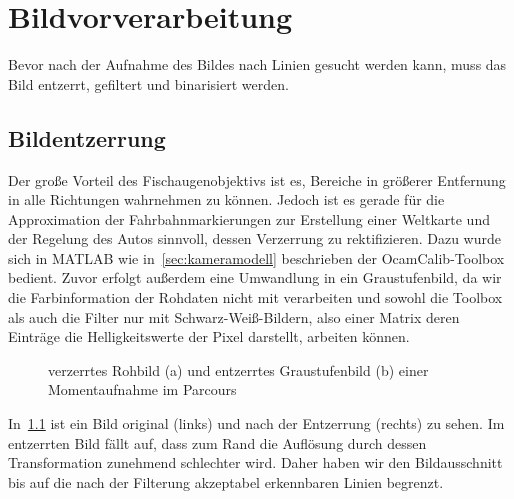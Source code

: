 \chapter{Bildvorverarbeitung \dcfirstauthorshort}
\label{cha:bildvorverarbeitung}

Bevor nach der Aufnahme des Bildes nach Linien gesucht werden kann, muss das Bild entzerrt, gefiltert und binarisiert werden. 

\section{Bildentzerrung}

Der große Vorteil des Fischaugenobjektivs ist es, Bereiche in größerer Entfernung in alle Richtungen  wahrnehmen zu können. Jedoch ist es gerade für die Approximation der Fahrbahnmarkierungen zur Erstellung einer Weltkarte und der Regelung des Autos sinnvoll, dessen Verzerrung zu rektifizieren. Dazu wurde sich in MATLAB wie in~\ref{sec:kameramodell} beschrieben der OcamCalib-Toolbox bedient. Zuvor erfolgt außerdem eine Umwandlung in ein Graustufenbild, da wir die Farbinformation der Rohdaten nicht mit verarbeiten und sowohl die Toolbox als auch die Filter nur mit Schwarz-Weiß-Bildern, also einer Matrix deren Einträge die Helligkeitswerte der Pixel darstellt, arbeiten können. 

\begin{figure}[ht] %
  \centering
  \qquad
  \caption{verzerrtes Rohbild (a) und entzerrtes Graustufenbild (b) einer Momentaufnahme im Parcours}
\label{fig:bildvorverarbeitung_entzerren}
\end{figure} 

In~\ref{fig:bildvorverarbeitung_entzerren} ist ein Bild original (links) und nach der Entzerrung (rechts) zu sehen. Im entzerrten Bild fällt auf, dass zum Rand die Auflösung durch dessen Transformation zunehmend schlechter wird. 
Daher haben wir den Bildausschnitt bis auf die nach der Filterung akzeptabel erkennbaren Linien begrenzt.

